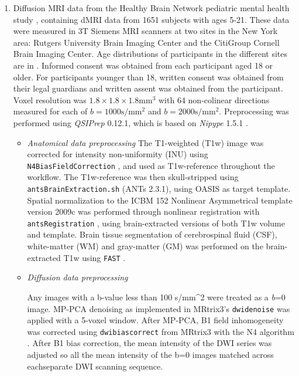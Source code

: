 \documentclass[10pt,letterpaper]{article}
\begin{document}
\begin{enumerate}
\item Diffusion MRI data from the Healthy Brain Network pediatric mental
health study \cite{alexander2017open}, containing dMRI data from 1651 subjects
with ages 5-21. These data were measured in 3T Siemens MRI scanners at two
sites in the New York
area: Rutgers University Brain Imaging Center and the CitiGroup Cornell Brain Imaging Center. Age distributions of participants in the different sites are in .
Informed consent was obtained from each participant aged 18 or older. For
participants younger than 18, written consent was obtained from their legal
guardians and written assent was obtained from the participant. Voxel
resolution was $1.8 \times 1.8 \times 1.8 \text{mm}^3$ with 64 non-colinear directions
measured for each of $b=1000 \text{s} / \text{mm}^2$ and $b=2000 \text{s} /
\text{mm}^2$. Preprocessing was performed using \emph{QSIPrep} 0.12.1, which
is based on \emph{Nipype} 1.5.1 \cite[RRID:SCR\_002502]{nipype1,nipype2}.

\begin{itemize}

\item {\it Anatomical data preprocessing}
The T1-weighted (T1w) image was corrected for intensity non-uniformity
(INU) using \texttt{N4BiasFieldCorrection} \cite[ANTs 2.3.1]{n4}, and
used as T1w-reference throughout the workflow. The T1w-reference was
then skull-stripped using \texttt{antsBrainExtraction.sh} (ANTs 2.3.1),
using OASIS as target template. Spatial normalization to the ICBM 152
Nonlinear Asymmetrical template version 2009c
\cite[RRID:SCR\_008796]{mni} was performed through nonlinear
registration with \texttt{antsRegistration} \cite[ANTs 2.3.1,
RRID:SCR\_004757]{ants}, using brain-extracted versions of both T1w
volume and template. Brain tissue segmentation of cerebrospinal fluid
(CSF), white-matter (WM) and gray-matter (GM) was performed on the
brain-extracted T1w using \texttt{FAST} \cite[FSL 6.0.3:b862cdd5,
RRID:SCR\_002823]{fsl_fast}.

\item {\it Diffusion data preprocessing}

Any images with a b-value less than 100 s/mm\^{}2 were treated as a
\emph{b}=0 image. MP-PCA denoising as implemented in MRtrix3's
\texttt{dwidenoise}\cite{dwidenoise1} was applied with a 5-voxel
window. After MP-PCA, B1 field inhomogeneity was corrected using
\texttt{dwibiascorrect} from MRtrix3 with the N4 algorithm \cite{n4}.
After B1 bias correction, the mean intensity of the DWI series was
adjusted so all the mean intensity of the b=0 images matched across
eachseparate DWI scanning sequence.


\end{itemize}
\end{enumerate}
\end{document}
